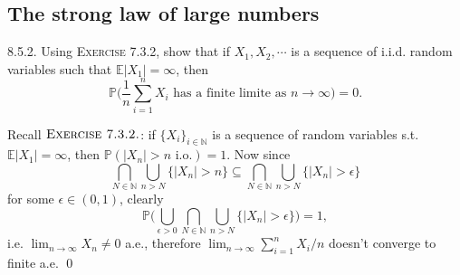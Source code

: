 \subsection{The strong law of large numbers}
\begin{exercise} 8.5.2. Using \textsc{Exercise} 7.3.2, show that if $X_1, X_2,\cdots$ is a sequence
of i.i.d. random variables such that $\mathbb{E}|X_1| = \infty$, then
\begin{equation*}
    \mathbb{P}\Big(\frac{1}{n}\sum_{i=1}^nX_i\text{ has a finite limite as }n\rightarrow\infty\Big)=0.
\end{equation*}

\end{exercise}
\begin{answer} Recall $\textsc{Exercise 7.3.2.}$: if $\{X_i\}_{i\in\mathbb{N}}$ is a sequence of random variables s.t. $\mathbb{E}|X_1|=\infty$, then $\mathbb{P}(|X_n|>n\text{ i.o.})=1$. Now since
\begin{equation*}
    \bigcap_{N\in\mathbb{N}}\bigcup_{n>N}\{|X_n|>n\}\subseteq\bigcap_{N\in\mathbb{N}}\bigcup_{n>N}\{|X_n|>\epsilon\}
\end{equation*}
for some $\epsilon\in(0,1)$, clearly
\begin{equation*}
    \mathbb{P}\Big(\bigcup_{\epsilon>0}\bigcap_{N\in\mathbb{N}}\bigcup_{n>N}\{|X_n|>\epsilon\}\Big)=1,
\end{equation*}
i.e. $\lim_{n\rightarrow\infty}X_n\neq 0$ a.e., therefore $\lim_{n\rightarrow\infty}\sum_{i=1}^nX_i/n$ doesn't converge to finite a.e.
\qed \qquad
\end{answer}

